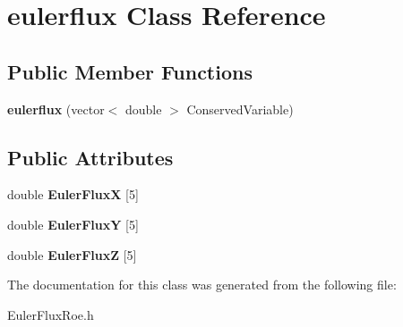 \hypertarget{classeulerflux}{}\section{eulerflux Class Reference}
\label{classeulerflux}
\subsection*{Public Member Functions}
\begin{DoxyCompactItemize}
\item 
{\bfseries eulerflux} (vector$<$ double $>$ Conserved\+Variable)\hypertarget{classeulerflux_ac324f8901af730de4b90b885cc87ca41}{}\label{classeulerflux_ac324f8901af730de4b90b885cc87ca41}

\end{DoxyCompactItemize}
\subsection*{Public Attributes}
\begin{DoxyCompactItemize}
\item 
double {\bfseries Euler\+FluxX} \mbox{[}5\mbox{]}\hypertarget{classeulerflux_a0282624fae997ac54441271130497185}{}\label{classeulerflux_a0282624fae997ac54441271130497185}

\item 
double {\bfseries Euler\+FluxY} \mbox{[}5\mbox{]}\hypertarget{classeulerflux_afdebc952e09629e73d7dcdda3e9e60ce}{}\label{classeulerflux_afdebc952e09629e73d7dcdda3e9e60ce}

\item 
double {\bfseries Euler\+FluxZ} \mbox{[}5\mbox{]}\hypertarget{classeulerflux_aaf2a28c94cb1cad57800342f8496c4b2}{}\label{classeulerflux_aaf2a28c94cb1cad57800342f8496c4b2}

\end{DoxyCompactItemize}


The documentation for this class was generated from the following file\+:\begin{DoxyCompactItemize}
\item 
Euler\+Flux\+Roe.\+h\end{DoxyCompactItemize}
